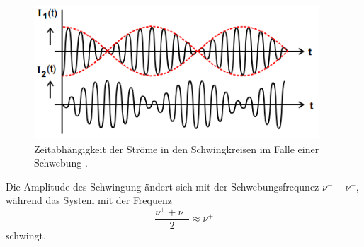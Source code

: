 \begin{figure}[H]
	\centering
	\includegraphics[height=5cm]{picture/Schwebungsfrequenz.PNG}
	\caption{Zeitabhängigkeit der Ströme in den Schwingkreisen im Falle einer Schwebung \cite{sample}.}
	\label{fig:SchFre}
\end{figure}

Die Amplitude des Schwingung ändert sich mit der Schwebungsfrequnez $\nu^- - \nu^+$, während das System mit der Frequenz
\begin{equation*}
	\frac{\nu^+ + \nu^-}{2} \approx \nu^+
\end{equation*}
schwingt.

